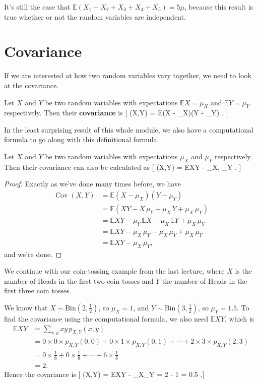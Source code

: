 \documentclass[
  letterpaper,
  DIV=11,
  numbers=noendperiod]{scrreprt}
\theoremstyle{remark}
\begin{document}
It's still the case that
\(\mathbb E(X_1 + X_2 + X_3 + X_4 + X_5) = 5\mu\), because this result
is true whether or not the random variables are independent.

\hypertarget{covariance}{%
\section{Covariance}\label{covariance}}

If we are interested at how two random variables vary together, we need
to look at the covariance.

\newcommand{\Cov}{\operatorname{Cov}}
\newcommand{\Corr}{\operatorname{Corr}}

Let \(X\) and \(Y\) be two random variables with expectations
\(\mathbb EX =\mu_X\) and \(\mathbb EY = \mu_Y\) respectively. Then
their \textbf{covariance} is {[} (X,Y) = \mathbb E(X -
\mu\_X)(Y - \mu\_Y) . {]}

In the least surprising result of this whole module, we also have a
computational formula to go along with this definitional formula.

Let \(X\) and \(Y\) be two random variables with expectations \(\mu_X\)
and \(\mu_Y\) respectively. Then their covariance can also be calculated
as {[} (X,Y) = \mathbb EXY - \mu\_X, \mu\_Y . {]}

\begin{proof}

Exactly as we've done many times before, we have \begin{align*}
\operatorname{Cov}(X,Y) &= \mathbb E(X - \mu_X)(Y - \mu_Y) \\
&= \mathbb E(XY - X\,\mu_Y - \mu_X\, Y + \mu_X\,\mu_Y) \\
&= \mathbb EXY  - \mu_Y \,\mathbb EX - \mu_X \,\mathbb EY + \mu_X \, \mu_Y \\
&= \mathbb EXY - \mu_X \, \mu_Y - \mu_X \, \mu_Y + \mu_X \, \mu_Y \\
&= \mathbb EXY - \mu_X \, \mu_Y ,
\end{align*} and we're done.

\end{proof}

We continue with our coin-tossing example from the last lecture, where
\(X\) is the number of Heads in the first two coin tosses and \(Y\) the
number of Heads in the first three coin tosses.

We know that \(X \sim \text{Bin}(2, \frac12)\), so \(\mu_X = 1\), and
\(Y \sim \text{Bin}(3, \frac12)\), so \(\mu_Y = 1.5\). To find the
covariance using the computational formula, we also need
\(\mathbb EXY\), which is \begin{align*}
\mathbb EXY &= \sum_{x,y} xy\, p_{X,Y}(x,y) \\
  &= 0\times 0\times p_{X,Y}(0,0) + 0 \times 1 \times p_{X,Y}(0,1) + \cdots + 2\times 3 \times p_{X,Y}(2,3) \\
  &= 0 \times \tfrac18 + 0 \times \tfrac18 + \cdots + 6 \times \tfrac18 \\
  &= 2.
\end{align*} Hence the covariance is {[}  (X,Y) =
\mathbb EXY - \mu\_X\mu\_Y = 2 - 1  = 0.5 .{]}
\end{document}
